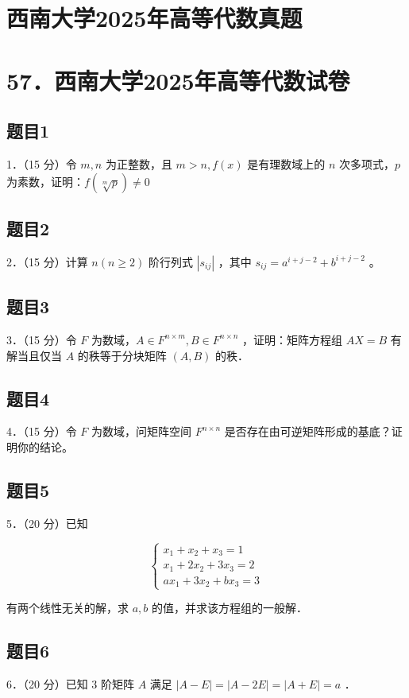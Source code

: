 \documentclass{article}
\begin{document}
\section*{西南大学2025年高等代数真题}
\section*{57．西南大学2025年高等代数试卷}

\subsection{题目1}
1．（15 分）令 \(m, n\) 为正整数，且 \(m>n, f(x)\) 是有理数域上的 \(n\) 次多项式，\(p\) 为素数，证明：\(f(\sqrt[m]{p}) \neq 0\)

\subsection{题目2}
2．（15 分）计算 \(n(n \geq 2)\) 阶行列式 \(\left|s_{i j}\right|\) ，其中 \(s_{i j}=a^{i+j-2}+b^{i+j-2}\) 。

\subsection{题目3}
3．（15 分）令 \(F\) 为数域，\(A \in F^{n \times m}, B \in F^{n \times n}\) ，证明：矩阵方程组 \(A X=B\) 有解当且仅当 \(A\) 的秩等于分块矩阵 \((A, B)\) 的秩．

\subsection{题目4}
4．（15 分）令 \(F\) 为数域，问矩阵空间 \(F^{n \times n}\) 是否存在由可逆矩阵形成的基底？证明你的结论。

\subsection{题目5}
5．（20 分）已知

\[
\left\{\begin{array}{l}
x_{1}+x_{2}+x_{3}=1 \\
x_{1}+2 x_{2}+3 x_{3}=2 \\
a x_{1}+3 x_{2}+b x_{3}=3
\end{array}\right.
\]

有两个线性无关的解，求 \(a, b\) 的值，并求该方程组的一般解．

\subsection{题目6}
6．（20 分）已知 3 阶矩阵 \(A\) 满足 \(|A-E|=|A-2 E|=|A+E|=a\) ．
\end{document}
